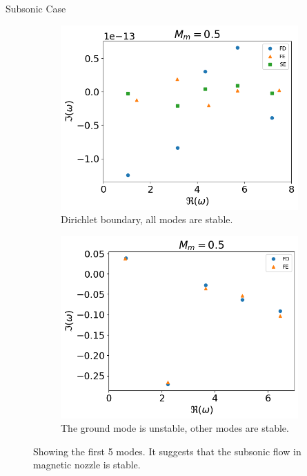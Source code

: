 \begin{frame}{Subsonic Case}
  \begin{figure} [H]
    \centering
    \begin{subfigure}{0.45\textwidth}
      \centering
      \includegraphics[width=\linewidth]{../../thesis/img/numerical-experiments/fixed-fixed/subsonic-v}
      \caption{Dirichlet boundary, all modes are stable.}
    \end{subfigure}%
    \begin{subfigure}{0.45\textwidth}
      \includegraphics[width=\linewidth]{../../thesis/img/numerical-experiments/fixed-open/subsonic-v}
      \caption{The ground mode is unstable, other modes are stable.}
    \end{subfigure}
    \caption{Showing the first 5 modes. It suggests that the subsonic flow in magnetic nozzle is stable.}
  \end{figure}
\end{frame}

